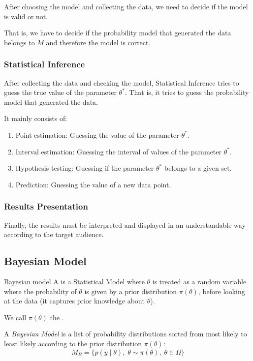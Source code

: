 After choosing the model and collecting the data, we need to decide if
the model is valid or not.

That is, we have to decide if the probability model that generated the data
belongs to $M$ and therefore the model is correct.

\subsubsection{Statistical Inference}

After collecting the data and checking the model, Statistical Inference
tries to guess the true value of the parameter $\theta^*$. That is, it tries
to guess the probability model that generated the data.

It mainly consists of:
\begin{enumerate}
	\item Point estimation: Guessing the value of the parameter $\theta^*$.
	\item Interval estimation: Guessing the interval of values of the parameter $\theta^*$.
	\item Hypothesis testing: Guessing if the parameter $\theta^*$ belongs to a given set.
	\item Prediction: Guessing the value of a new data point.
\end{enumerate}

\subsubsection{Results Presentation}

Finally, the results must be interpreted and displayed in an understandable way
according to the target audience.

\subsection{Bayesian Model}

\begin{definition}{Bayesian model}{}{}
	A  is a Statistical Model where $\theta$ is treated as a random variable
	where the probability of $\theta$ is given by a prior distribution $\pi(\theta)$,
	before looking at the data (it captures prior knowledge about $\theta$).

	We call $\pi(\theta)$ the .

	A \emph{Bayesian Model} is a list of probability distributions sorted from most
	likely to least likely according to the prior distribution $\pi(\theta)$:
	\begin{equation}
		M_B = \{ p(\tilde{y}\mid\theta), \; \theta \sim \pi(\theta), \; \theta \in \Omega \}
	\end{equation}
\end{definition}

